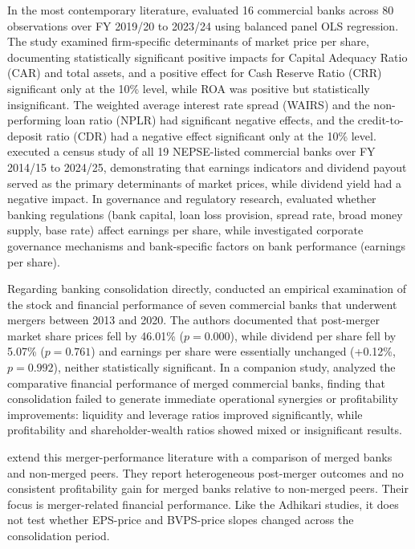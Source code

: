 In the most contemporary literature, \citet{niraula2026} evaluated 16 commercial banks across 80 observations over FY 2019/20 to 2023/24 using balanced panel OLS regression. The study examined firm-specific determinants of market price per share, documenting statistically significant positive impacts for Capital Adequacy Ratio (CAR) and total assets, and a positive effect for Cash Reserve Ratio (CRR) significant only at the 10\% level, while ROA was positive but statistically insignificant. The weighted average interest rate spread (WAIRS) and the non-performing loan ratio (NPLR) had significant negative effects, and the credit-to-deposit ratio (CDR) had a negative effect significant only at the 10\% level. \citet{bhandari2026} executed a census study of all 19 NEPSE-listed commercial banks over FY 2014/15 to 2024/25, demonstrating that earnings indicators and dividend payout served as the primary determinants of market prices, while dividend yield had a negative impact. In governance and regulatory research, \citet{bhattarai2024} evaluated whether banking regulations (bank capital, loan loss provision, spread rate, broad money supply, base rate) affect earnings per share, while \citet{dongol2024} investigated corporate governance mechanisms and bank-specific factors on bank performance (earnings per share).

Regarding banking consolidation directly, \citet{adhikari2023} conducted an empirical examination of the stock and financial performance of seven commercial banks that underwent mergers between 2013 and 2020. The authors documented that post-merger market share prices fell by 46.01\% ($p = 0.000$), while dividend per share fell by 5.07\% ($p = 0.761$) and earnings per share were essentially unchanged (+0.12\%, $p = 0.992$), neither statistically significant. In a companion study, \citet{adhikari2023cbr} analyzed the comparative financial performance of merged commercial banks, finding that consolidation failed to generate immediate operational synergies or profitability improvements: liquidity and leverage ratios improved significantly, while profitability and shareholder-wealth ratios showed mixed or insignificant results.

\citet{acharya2026merger} extend this merger-performance literature with a comparison of merged banks and non-merged peers. They report heterogeneous post-merger outcomes and no consistent profitability gain for merged banks relative to non-merged peers. Their focus is merger-related financial performance. Like the Adhikari studies, it does not test whether EPS-price and BVPS-price slopes changed across the consolidation period.

